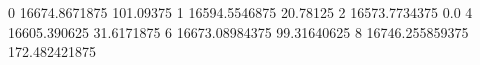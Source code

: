 0 16674.8671875 101.09375
1 16594.5546875 20.78125
2 16573.7734375 0.0
4 16605.390625 31.6171875
6 16673.08984375 99.31640625
8 16746.255859375 172.482421875
